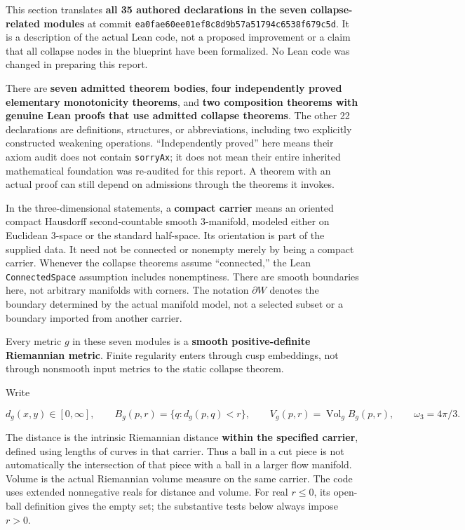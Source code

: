 \documentclass[
  letterpaper,
  11pt]{article}
\begin{document}
This section translates \textbf{all 35 authored declarations in the
seven collapse-related modules} at commit
{\small\texttt{ea0fae6\allowbreak{}0ee01ef8\allowbreak{}c8d9b57a\allowbreak{}51794c65\allowbreak{}38f679c5\allowbreak{}d}}.
It is a description of the actual Lean code, not a proposed improvement
or a claim that all collapse nodes in the blueprint have been
formalized. No Lean code was changed in preparing this report.

There are \textbf{seven admitted theorem bodies}, \textbf{four
independently proved elementary monotonicity theorems}, and \textbf{two
composition theorems with genuine Lean proofs that use admitted collapse
theorems}. The other 22 declarations are definitions, structures, or
abbreviations, including two explicitly constructed weakening
operations. ``Independently proved'' here means their axiom audit does
not contain {\small\texttt{sorry\allowbreak{}Ax}}; it does not mean
their entire inherited mathematical foundation was re-audited for this
report. A theorem with an actual proof can still depend on admissions
through the theorems it invokes.

In the three-dimensional statements, a \textbf{compact carrier} means an
oriented compact Hausdorff second-countable smooth 3-manifold, modeled
either on Euclidean 3-space or the standard half-space. Its orientation
is part of the supplied data. It need not be connected or nonempty
merely by being a compact carrier. Whenever the collapse theorems assume
``connected,'' the Lean {\small\texttt{Connected\allowbreak{}Space}}
assumption includes nonemptiness. There are smooth boundaries here, not
arbitrary manifolds with corners. The notation \(\partial W\) denotes
the boundary determined by the actual manifold model, not a selected
subset or a boundary imported from another carrier.

Every metric \(g\) in these seven modules is a \textbf{smooth
positive-definite Riemannian metric}. Finite regularity enters through
cusp embeddings, not through nonsmooth input metrics to the static
collapse theorem.

Write

\[
 d_g(x,y)\in[0,\infty],\qquad B_g(p,r)=\{q:d_g(p,q)<r\},\qquad
 V_g(p,r)=\operatorname{Vol}_g B_g(p,r),\qquad \omega_3=4\pi/3.
\]

The distance is the intrinsic Riemannian distance \textbf{within the
specified carrier}, defined using lengths of curves in that carrier.
Thus a ball in a cut piece is not automatically the intersection of that
piece with a ball in a larger flow manifold. Volume is the actual
Riemannian volume measure on the same carrier. The code uses extended
nonnegative reals for distance and volume. For real \(r\leq0\), its
open-ball definition gives the empty set; the substantive tests below
always impose \(r>0\).
\end{document}
